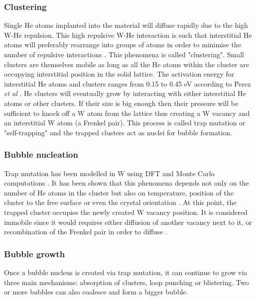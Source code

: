 \subsubsection{Clustering}
Single He atoms implanted into the material will diffuse rapidly due to the high W-He repulsion.
This high repulsive W-He interaction is such that interstitial He atoms will preferably rearrange into groups of atoms in order to minimise the number of repulsive interactions \cite{hamid_molecular_2019, hammond_large-scale_2018}.
This phenomena is called "clustering".
Small clusters are themselves mobile as long as all the He atoms within the cluster are occupying interstitial position in the solid lattice.
The activation energy for interstitial He atoms and clusters ranges from 0.15 to 0.45 eV according to Perez \textit{et al} \cite{perez_mobility_2017}.
He clusters will eventually grow by interacting with either interstitial He atoms or other clusters.
If their size is big enough then their pressure will be sufficient to knock off a W atom from the lattice thus creating a W vacancy and an interstitial W atom (a Frenkel pair).
This process is called trap mutation or "self-trapping" and the trapped clusters act as nuclei for bubble formation.

\subsubsection{Bubble nucleation}

Trap mutation has been modelled in W using DFT \cite{boisse_modelling_2014} and Monte Carlo computations \cite{de_backer_modeling_2015}.
It has been shown that this phenomena depends not only on the number of He atoms in the cluster but also on temperature, position of the cluster to the free surface or even the crystal orientation \cite{blondel_modeling_2017, hu_interactions_2014, hu_dynamics_2014}.
At this point, the trapped cluster occupies the newly created W vacancy position.
It is considered immobile since it would requires either diffusion of another vacancy next to it, or recombination of the Frenkel pair in order to diffuse \cite{morishita_nucleation_2007}.

\subsubsection{Bubble growth}

Once a bubble nucleus is created via trap mutation, it can continue to grow via three main mechanisms: absorption of clusters, loop punching or blistering.
Two or more bubbles can also coalesce and form a bigger bubble.

